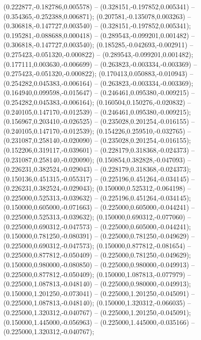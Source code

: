  (0.222877,-0.182786,0.005578) -- (0.328151,-0.197852,0.005341) -- (0.354365,-0.252388,0.006871);
 (0.207581,-0.135078,0.003263) -- (0.306818,-0.147727,0.003540) -- (0.328151,-0.197852,0.005341);
 (0.195281,-0.088688,0.000418) -- (0.289543,-0.099201,0.001482) -- (0.306818,-0.147727,0.003540);
 (0.185285,-0.042693,-0.002911) -- (0.275423,-0.051320,-0.000822) -- (0.289543,-0.099201,0.001482);
 (0.177111,0.003630,-0.006699) -- (0.263823,-0.003334,-0.003369) -- (0.275423,-0.051320,-0.000822);
 (0.170413,0.050883,-0.010943) -- (0.254282,0.045383,-0.006164) -- (0.263823,-0.003334,-0.003369);
 (0.164940,0.099598,-0.015647) -- (0.246461,0.095380,-0.009215) -- (0.254282,0.045383,-0.006164);
 (0.160504,0.150276,-0.020832) -- (0.240105,0.147170,-0.012539) -- (0.246461,0.095380,-0.009215);
 (0.156967,0.203410,-0.026525) -- (0.235028,0.201254,-0.016155) -- (0.240105,0.147170,-0.012539);
 (0.154226,0.259510,-0.032765) -- (0.231087,0.258140,-0.020090) -- (0.235028,0.201254,-0.016155);
 (0.152206,0.319117,-0.039601) -- (0.228179,0.318368,-0.024373) -- (0.231087,0.258140,-0.020090);
 (0.150854,0.382828,-0.047093) -- (0.226231,0.382524,-0.029043) -- (0.228179,0.318368,-0.024373);
 (0.150136,0.451315,-0.055317) -- (0.225196,0.451264,-0.034145) -- (0.226231,0.382524,-0.029043);
 (0.150000,0.525312,-0.064198) -- (0.225000,0.525313,-0.039632) -- (0.225196,0.451264,-0.034145);
 (0.150000,0.605000,-0.071663) -- (0.225000,0.605000,-0.044241) -- (0.225000,0.525313,-0.039632);
 (0.150000,0.690312,-0.077060) -- (0.225000,0.690312,-0.047573) -- (0.225000,0.605000,-0.044241);
 (0.150000,0.781250,-0.080391) -- (0.225000,0.781250,-0.049629) -- (0.225000,0.690312,-0.047573);
 (0.150000,0.877812,-0.081654) -- (0.225000,0.877812,-0.050409) -- (0.225000,0.781250,-0.049629);
 (0.150000,0.980000,-0.080850) -- (0.225000,0.980000,-0.049913) -- (0.225000,0.877812,-0.050409);
 (0.150000,1.087813,-0.077979) -- (0.225000,1.087813,-0.048140) -- (0.225000,0.980000,-0.049913);
 (0.150000,1.201250,-0.073041) -- (0.225000,1.201250,-0.045091) -- (0.225000,1.087813,-0.048140);
 (0.150000,1.320312,-0.066035) -- (0.225000,1.320312,-0.040767) -- (0.225000,1.201250,-0.045091);
 (0.150000,1.445000,-0.056963) -- (0.225000,1.445000,-0.035166) -- (0.225000,1.320312,-0.040767);
